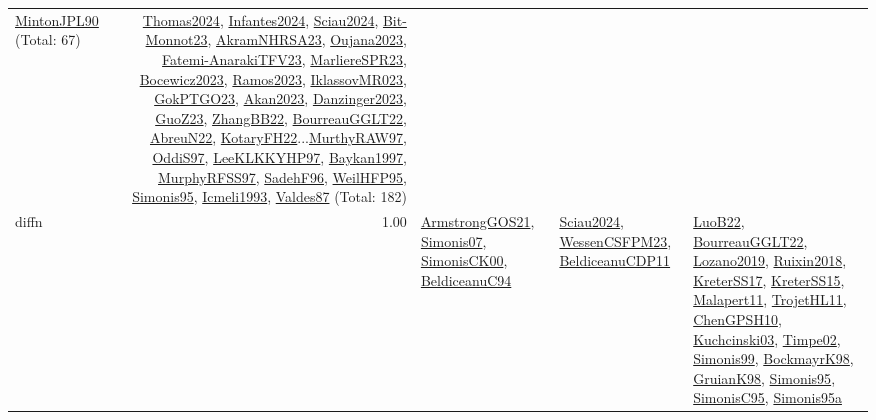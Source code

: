 {\begin{longtable}{p{3cm}r>{\raggedright\arraybackslash}p{6cm}>{\raggedright\arraybackslash}p{6cm}>{\raggedright\arraybackslash}p{8cm}}
\hyperref[detail:MintonJPL90]{MintonJPL90} (Total: 67) & \hyperref[detail:Thomas2024]{Thomas2024}, \hyperref[detail:Infantes2024]{Infantes2024}, \hyperref[detail:Sciau2024]{Sciau2024}, \hyperref[detail:Bit-Monnot23]{Bit-Monnot23}, \hyperref[detail:AkramNHRSA23]{AkramNHRSA23}, \hyperref[detail:Oujana2023]{Oujana2023}, \hyperref[detail:Fatemi-AnarakiTFV23]{Fatemi-AnarakiTFV23}, \hyperref[detail:MarliereSPR23]{MarliereSPR23}, \hyperref[detail:Bocewicz2023]{Bocewicz2023}, \hyperref[detail:Ramos2023]{Ramos2023}, \hyperref[detail:IklassovMR023]{IklassovMR023}, \hyperref[detail:GokPTGO23]{GokPTGO23}, \hyperref[detail:Akan2023]{Akan2023}, \hyperref[detail:Danzinger2023]{Danzinger2023}, \hyperref[detail:GuoZ23]{GuoZ23}, \hyperref[detail:ZhangBB22]{ZhangBB22}, \hyperref[detail:BourreauGGLT22]{BourreauGGLT22}, \hyperref[detail:AbreuN22]{AbreuN22}, \hyperref[detail:KotaryFH22]{KotaryFH22}...\hyperref[detail:MurthyRAW97]{MurthyRAW97}, \hyperref[detail:OddiS97]{OddiS97}, \hyperref[detail:LeeKLKKYHP97]{LeeKLKKYHP97}, \hyperref[detail:Baykan1997]{Baykan1997}, \hyperref[detail:MurphyRFSS97]{MurphyRFSS97}, \hyperref[detail:SadehF96]{SadehF96}, \hyperref[detail:WeilHFP95]{WeilHFP95}, \hyperref[detail:Simonis95]{Simonis95}, \hyperref[detail:Icmeli1993]{Icmeli1993}, \hyperref[detail:Valdes87]{Valdes87} (Total: 182)\\
\index{diffn}\index{Constraints!diffn}diffn &  1.00 & \hyperref[detail:ArmstrongGOS21]{ArmstrongGOS21}, \hyperref[detail:Simonis07]{Simonis07}, \hyperref[detail:SimonisCK00]{SimonisCK00}, \hyperref[detail:BeldiceanuC94]{BeldiceanuC94} & \hyperref[detail:Sciau2024]{Sciau2024}, \hyperref[detail:WessenCSFPM23]{WessenCSFPM23}, \hyperref[detail:BeldiceanuCDP11]{BeldiceanuCDP11} & \hyperref[detail:LuoB22]{LuoB22}, \hyperref[detail:BourreauGGLT22]{BourreauGGLT22}, \hyperref[detail:Lozano2019]{Lozano2019}, \hyperref[detail:Ruixin2018]{Ruixin2018}, \hyperref[detail:KreterSS17]{KreterSS17}, \hyperref[detail:KreterSS15]{KreterSS15}, \hyperref[detail:Malapert11]{Malapert11}, \hyperref[detail:TrojetHL11]{TrojetHL11}, \hyperref[detail:ChenGPSH10]{ChenGPSH10}, \hyperref[detail:Kuchcinski03]{Kuchcinski03}, \hyperref[detail:Timpe02]{Timpe02}, \hyperref[detail:Simonis99]{Simonis99}, \hyperref[detail:BockmayrK98]{BockmayrK98}, \hyperref[detail:GruianK98]{GruianK98}, \hyperref[detail:Simonis95]{Simonis95}, \hyperref[detail:SimonisC95]{SimonisC95}, \hyperref[detail:Simonis95a]{Simonis95a}\\

\end{longtable}}
